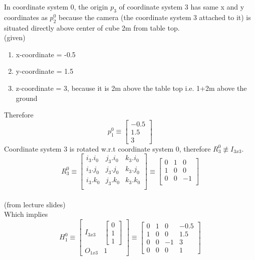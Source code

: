 \documentclass[12pt]{article}
\newcommand{\fromslides}{{\\ \color{blue} \hspace*{\fill}(from lecture slides)} \\}
\newcommand{\given}{{\\ \color{blue} \hspace*{\fill}(given)} \\}
\begin{document}
In coordinate system 0, the origin $ p_{3} $ of coordinate system 3 has same x and y coordinates as $ p_{2}^{0} $ because the camera (the coordinate system 3 attached to it) is situated directly above center of cube 2m from table top.
\given
\begin{enumerate}[nolistsep]
  \item x-coordinate = -0.5
  \item y-coordinate = 1.5
  \item z-coordinate = 3, because it is 2m above the table top i.e. 1+2m above the ground
\end{enumerate}
Therefore
\[
  p_{1}^{0} \equiv \begin{bmatrix} -0.5 \\ 1.5 \\ 3 \end{bmatrix}
\]
Coordinate system 3 is rotated w.r.t coordinate system 0, therefore $ R_{3}^{0} \not\equiv I_{3x3} $.
\[
  R_{3}^{0}
  \equiv \begin{bmatrix}
        i_3.i_0 & j_3.i_0 & k_3.i_0\\
        i_3.j_0 & j_3.j_0 & k_3.j_0\\
        i_3.k_0 & j_3.k_0 & k_3.k_0\\
        \end{bmatrix}
  \equiv \begin{bmatrix}
        0 & 1 & 0\\
        1 & 0 & 0\\
        0 & 0 & -1\\
        \end{bmatrix}
\]
\fromslides

Which implies
\[
  H_{1}^{0}
  \equiv \begin{bmatrix} I_{3x3} & \begin{bmatrix} 0 \\ 1 \\ 1 \end{bmatrix} \\ O_{1x3} & 1 \end{bmatrix}
  \equiv \begin{bmatrix}
          0 & 1 & 0 & -0.5\\
          1 & 0 & 0 & 1.5\\
          0 & 0 & -1 & 3\\
          0 & 0 & 0 & 1
        \end{bmatrix}
\]
\end{document}
